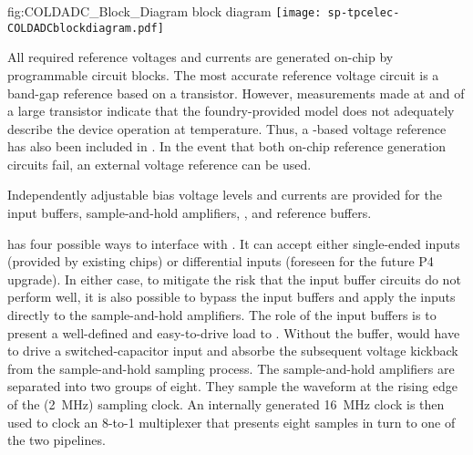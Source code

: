 \begin{dunefigure}
{fig:COLDADC_Block_Diagram}
{ block diagram}
\texttt{[image: sp-tpcelec-COLDADCblockdiagram.pdf]}
\end{dunefigure}

All required reference voltages and currents are generated on-chip by programmable
circuit blocks. The most accurate reference voltage circuit is a band-gap reference
based on a  transistor.  However, measurements made at  and
 of a large  transistor indicate that the foundry-provided  model
does not adequately describe the device operation at \lar temperature.  Thus,
a -based voltage reference has also been included in .
In the event that both on-chip reference generation circuits fail, an external voltage
reference can be used.

Independently adjustable bias voltage levels and currents are provided for the
input buffers, sample-and-hold amplifiers, , and 
reference buffers.

 has four possible ways to interface with .  It
can accept either single-ended inputs (provided by existing 
chips) or differential inputs (foreseen for the future  P4 upgrade).
In either case, to mitigate the risk that the input buffer circuits do not perform
well, it is also possible to bypass the input buffers and apply the inputs directly
to the sample-and-hold amplifiers. The role of the input buffers is to present a well-defined
and easy-to-drive load to . Without the buffer,  would
have to drive a switched-capacitor input and absorbe the subsequent voltage
kickback from the sample-and-hold sampling process. The sample-and-hold amplifiers are separated
into two groups of eight. They sample the waveform at the rising edge of the
(\SI{2}{MHz}) sampling clock. An internally generated \SI{16}{MHz} clock is then
used to clock an \num{8}-to-\num{1} multiplexer that presents eight samples in 
turn to one of the two  pipelines.

